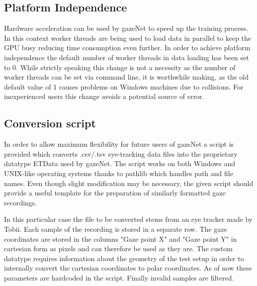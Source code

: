 \documentclass[conference]{IEEEtran}
\begin{document}
\subsection{Platform Independence}
Hardware acceleration can be used by gazeNet to speed up the training process. In this context worker threads are being used to load data in parallel to keep the GPU busy reducing time consumption even further. In order to achieve platform independence the default number of worker threads in data loading has been set to 0. While strictly speaking this change is not a necessity as the number of worker threads can be set via command line, it is worthwhile making, as the old default value of 1 causes problems on Windows machines due to collisions. For inexperienced users this change avoids a potential source of error.


\subsection{Conversion script}
In order to allow maximum flexibility for future users of gazeNet a script is provided which converts .csv/.tsv eye-tracking data files into the proprietary datatype ETData used by gazeNet. The script works on both Windows and UNIX-like operating systems thanks to pathlib which handles path and file names. Even though slight modification may be necessary, the given script should provide a useful template for the preparation of similarly formatted gaze recordings.

In this particular case the file to be converted stems from an eye tracker made by Tobii. Each sample of the recording is stored in a separate row. The gaze coordinates are stored in the columns "Gaze point X" and "Gaze point Y" in cartesian form as pixels and can therefore be used as they are. The custom datatype requires information about the geometry of the test setup in order to internally convert the cartesian coordinates to polar coordinates. As of now these parameters are hardcoded in the script. Finally invalid samples are filtered.
\end{document}

